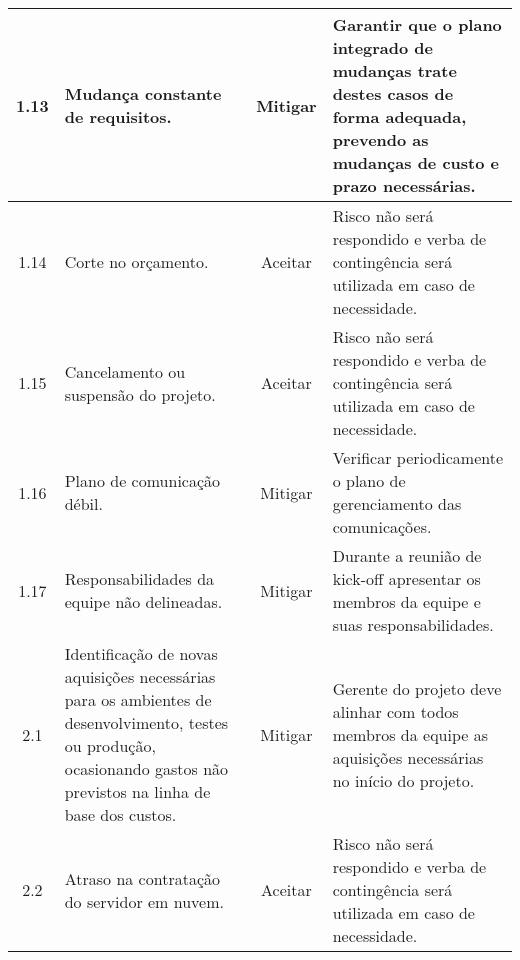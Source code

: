 \begin{longtable}{ c p{} c p{} }
	\midrule
	1.13                     & Mudança constante de requisitos.                                                                                                                                             & Mitigar                    & Garantir que o plano integrado de mudanças trate destes casos de forma adequada, prevendo as mudanças de custo e prazo necessárias. \\
	\midrule
	1.14                     & Corte no orçamento.                                                                                                                                                          & Aceitar                    & Risco não será respondido e verba de contingência será utilizada em caso de necessidade.                                           \\
	\midrule
	1.15                     & Cancelamento ou suspensão do projeto.                                                                                                                                        & Aceitar                    & Risco não será respondido e verba de contingência será utilizada em caso de necessidade.                                           \\
	\midrule
	1.16                     & Plano de comunicação débil.                                                                                                                                                & Mitigar                    & Verificar periodicamente o plano de gerenciamento das comunicações.                                                                  \\
	\midrule
	1.17                     & Responsabilidades da equipe não delineadas.                                                                                                                                  & Mitigar                    & Durante a reunião de kick-off apresentar os membros da equipe e suas responsabilidades.                                               \\
	\midrule
	2.1                      & Identificação de novas aquisições necessárias para os ambientes de desenvolvimento, testes ou produção, ocasionando gastos não previstos na linha de base dos custos. & Mitigar                    & Gerente do projeto deve alinhar com todos membros da equipe as aquisições necessárias no início do projeto.                        \\
	\midrule
	2.2                      & Atraso na contratação do servidor em nuvem.                                                                                                                                 & Aceitar                    & Risco não será respondido e verba de contingência será utilizada em caso de necessidade.                                           \\

\end{longtable}
